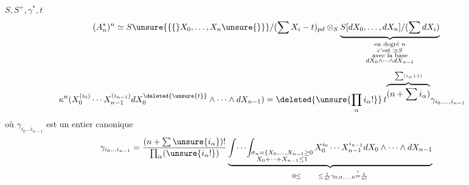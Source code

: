 $S,S^+,\gamma^*,t$
\[
 (A_n^*)^n\simeq S\unsure{\{\{}X_0,\ldots,X_n\unsure{\}\}}/(\sum X_i-t)_{pd}
 \otimes_S\underbrace{S[dX_0,\ldots,dX_n]/(\sum dX_i)}_{\substack{\text{en degré }n\\\text{c'est }\simeq S\\\text{avec la base}\\dX_0\wedge\cdots\wedge dX_{n-1}}}
\]
\[
\begin{aligned}
\kappa^n(X_0^{(i_0)}\cdots X_{n-1}^{(i_{n-1})}dX_0^{\deleted{\unsure{t}}}\wedge\cdots\wedge dX_{n-1})
 &=\deleted{\unsure{\prod_\alpha i_\alpha!}}\,
 t^{\overbrace{(n+\sum i_\alpha)}^{\sum(i_\alpha+1)}}\gamma_{i_0,\ldots,i_{n-1}}
\end{aligned}
\]
où $\gamma_{i_0\ldots i_{n-1}}$ est un entier canonique
\[
\gamma_{i_0\ldots i_{n-1}}=
\frac{(n+\sum\unsure{i_\alpha})!}{\prod_\alpha(\unsure{i_\alpha!})}
\underbrace{\int\!\cdots\!\int_{\substack{\sigma_n=\{X_0,\ldots,X_{n-1}\geq0\\X_0+\cdots+X_{n-1}\leq1}}
 X_0^{i_0}\cdots X_{n-1}^{i_{n-1}}dX_0\wedge\cdots\wedge dX_{n-1}}_{\substack{0\leq\qquad\leq\frac1{n!}\gamma_{0,0,\ldots,0}\overset?=\frac1{n!}}}
\]


